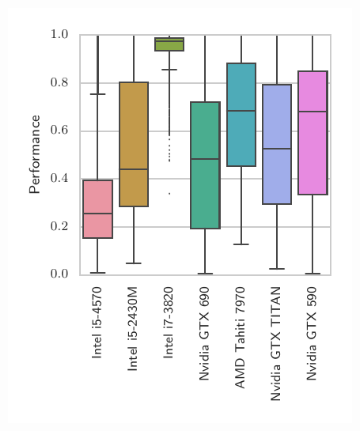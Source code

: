 \documentclass[nonatbib,preprint,nocopyrightspace,9pt]{sigplanconf}
\begin{document}
\begin{figure}
\begin{subfigure}[h]{.48\columnwidth}
      \includegraphics[width=\columnwidth]{img/performance_devices.pdf}
      \vspace{-1.5em} %
      \caption{}
      \label{fig:performance-devices}
    \end{subfigure}
    ~%
    \begin{subfigure}[h]{.48\columnwidth}
      \centering

\end{subfigure}
\end{figure}
\end{document}
